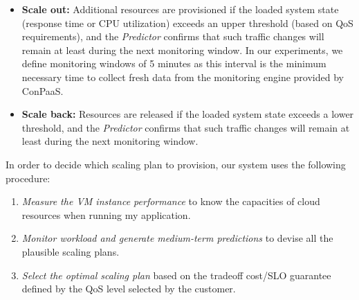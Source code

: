 \begin{itemize}

\item \textbf{Scale out:} Additional resources are provisioned if the loaded system state (response time or CPU utilization) exceeds an upper threshold (based on QoS requirements), and the \emph{Predictor} confirms that such traffic changes will remain at least during the next monitoring window. In our experiments, we define monitoring windows of 5 minutes as this interval is the minimum necessary time to collect fresh data from the monitoring engine provided by ConPaaS. 

\item \textbf{Scale back:} Resources are released if the loaded system state exceeds a lower threshold, and the \emph{Predictor} confirms that such traffic changes will remain at least during the next monitoring window.

\end{itemize}

In order to decide which scaling plan to provision, our system uses the following procedure:
\begin{enumerate}
\item \emph{Measure the VM instance performance} to know the capacities of cloud resources when running my application.
\item \emph{Monitor workload and generate medium-term predictions} to devise all the plausible scaling plans.
\item \emph{Select the optimal scaling plan} based on the tradeoff cost/SLO guarantee defined by the QoS level selected by the customer.
\end{enumerate}


